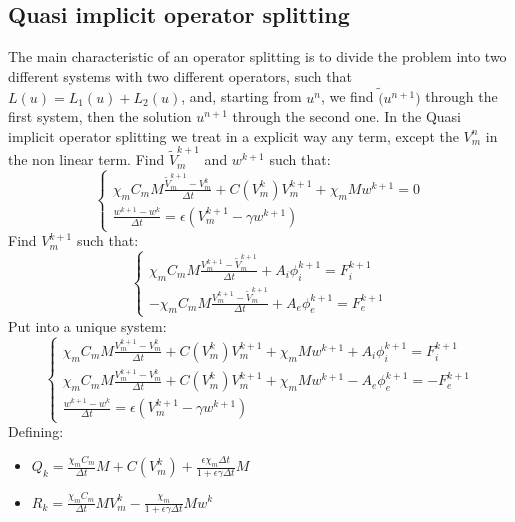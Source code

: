 \documentclass[a4paper,12pt]{article}
\begin{document}
\subsection{Quasi implicit operator splitting}
The main characteristic of an operator splitting is to divide the problem into two different systems with two different operators, such that $L(u)=L_1(u)+L_2(u)$, and, starting from $u^n$, we find $\tilde(u^{n+1})$ through the first system, then the solution $u^{n+1}$ through the second one.
In the Quasi implicit operator splitting we treat in a explicit way any term, except the $V_m^n$ in the non linear term.\newline
Find $\tilde{V}_m^{k+1}$ and $w^{k+1}$ such that:
\begin{equation}
\begin{cases}
\chi_m C_m M \frac{\tilde{V}_m^{k+1}-V_m^k}{\Delta t} +  C(V_m^k) V_m^{k+1} + \chi_m M w^{k+1}= 0\\
\frac{w^{k+1} - w^k}{\Delta t} = \epsilon (V_m^{k+1}-\gamma w^{k+1})
\end{cases}
\end{equation}
Find $V_m^{k+1}$ such that:
\begin{equation}
\begin{cases}
\chi_m C_m M \frac{V_m^{k+1}-\tilde{V}_m^{k+1}}{\Delta t} + A_i \phi_i^{k+1}= F_i^{k+1}\\
- \chi_m C_m M \frac{V_m^{k+1}-\tilde{V}_m^{k+1}}{\Delta t} + A_e \phi_e^{k+1}= F_e^{k+1}
\end{cases}
\end{equation}
Put into a unique system:
\begin{equation}\label{Quasi}
\begin{cases}
\chi_m C_m M \frac{V_m^{k+1}-V_m^{k}}{\Delta t} + C(V_m^k) V_m^{k+1} + \chi_m M w^{k+1} + A_i \phi_i ^{k+1} = F_i^{k+1} \\
\chi_m C_m M \frac{V_m^{k+1}-V_m^{k}}{\Delta t} +  C(V_m^k) V_m^{k+1} + \chi_m M w^{k+1} - A_e \phi_e ^{k+1} =  -F_e^{k+1} \\
\frac{w^{k+1}-w^{k}}{\Delta t} = \epsilon(V_m^{k+1}-\gamma w^{k+1})
\end{cases}
\end{equation}
Defining:
\begin{itemize}
\item $Q_k = \frac{\chi_m C_m}{\Delta t}M + C(V_m^k) + \frac{\epsilon\chi_m \Delta t}{1 + \epsilon \gamma \Delta t} M$ \\
\item $R_k = \frac{\chi_mC_m}{\Delta t}MV_m^k - \frac{\chi_m}{1+\epsilon\gamma\Delta t}M w^k$
\end{itemize}
\end{document}
